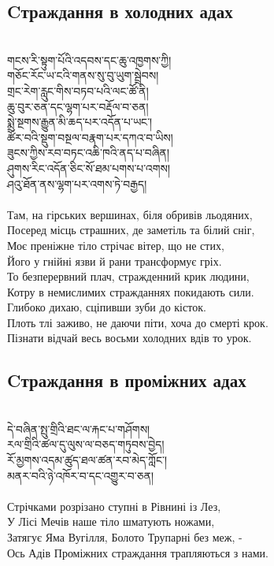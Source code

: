 \subsection*{Cтраждання в холодних адах}
\\
\ti
གངས་རི་སྟུག་པོའི་འདབས་དང་ཆུ་འཁྱགས་ཀྱི། \\
གཅོང་རོང་ཡ་ངའི་གནས་སུ་བུ་ཡུག་སྦྲེབས། \\
གྲང་རེག་རླུང་གིས་བཏབ་པའི་ལང་ཚོ་ནི། \\
ཆུ་བུར་ཅན་དང་ལྷག་པར་བརྡོལ་བ་ཅན། \\
སྨྲེ་སྔགས་རྒྱུན་མི་ཆད་པར་འདོན་པ་ཡང་། \\
ཚོར་བའི་སྡུག་བསྔལ་བརྣག་པར་དཀའ་བ་ཡིས།\\
ཟུངས་ཀྱིས་རབ་བཏང་འཆི་ཁའི་ནད་པ་བཞིན།\\
ཤུགས་རིང་འདོན་ཅིང་སོ་ཐམ་པགས་པ་འགས། \\
ཤའུ་ཐོན་ནས་ལྷག་པར་འགས་ཏེ་བརྒྱད།\\
\\
\ru
Там, на гірських вершинах, біля обривів льодяних,\\
Посеред місць страшних, де заметіль та білий сніг,\\
Моє преніжне тіло стрічає вітер, що не стих,\\
Його у гнійні язви й рани трансформує гріх.\\
То безперервний плач, стражденний крик людини,\\
Котру в немислимих стражданнях покидають сили.\\
Глибоко дихаю, сціпивши зуби до кісток.\\
Плоть тлі заживо, не даючи піти, хоча до смерті крок.\\
Пізнати відчай весь восьми холодних вдів то урок.\\

\newpage
\subsection*{Cтраждання в проміжних адах}
\\
\ti
དེ་བཞིན་སྤུ་གྲིའི་ཐང་ལ་རྐང་པ་གཤོགས།\\
རལ་གྲིའི་ཚལ་དུ་ལུས་ལ་བཅད་གཏུབས་བྱེད།\\
རོ་མྱགས་འདམ་ཚུད་ཐལ་ཚན་རབ་མེད་ཀློང་། \\
མནར་བའི་ཉེ་འཁོར་བ་དང་འགྱུར་བ་ཅན།\\
\\
\ru
Стрічками розрізано ступні в Рівнині із Лез,\\
У Лісі Мечів наше тіло шматують ножами,\\
Затягує Яма Вугілля, Болото Трупарні без меж, -\\
Ось Адів Проміжних страждання трапляються з нами.\\

